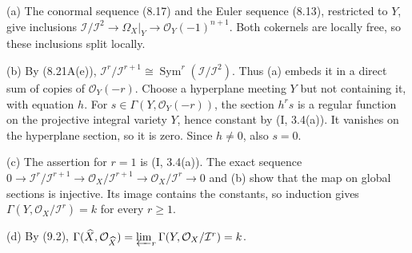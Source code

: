 (a) The conormal sequence (8.17) and the Euler sequence (8.13), restricted to $Y$, give inclusions $\mathcal I/\mathcal I^2\to\Omega_X|_Y\to\mathcal O_Y(-1)^{n+1}$. Both cokernels are locally free, so these inclusions split locally.

(b) By (8.21A(e)), $\mathcal I^r/\mathcal I^{r+1}\cong\operatorname{Sym}^r(\mathcal I/\mathcal I^2)$. Thus (a) embeds it in a direct sum of copies of $\mathcal O_Y(-r)$. Choose a hyperplane meeting $Y$ but not containing it, with equation $h$. For $s\in\Gamma(Y,\mathcal O_Y(-r))$, the section $h^rs$ is a regular function on the projective integral variety $Y$, hence constant by (I, 3.4(a)). It vanishes on the hyperplane section, so it is zero. Since $h\ne0$, also $s=0$.

(c) The assertion for $r=1$ is (I, 3.4(a)). The exact sequence $0\to\mathcal I^r/\mathcal I^{r+1}\to\mathcal O_X/\mathcal I^{r+1}\to\mathcal O_X/\mathcal I^r\to0$ and (b) show that the map on global sections is injective. Its image contains the constants, so induction gives $\Gamma(Y,\mathcal O_X/\mathcal I^r)=k$ for every $r\ge1$.

(d) By (9.2), $\Gamma(\widehat X,\mathcal O_{\widehat X})=\varprojlim_r\Gamma(Y,\mathcal O_X/\mathcal I^r)=k$.
